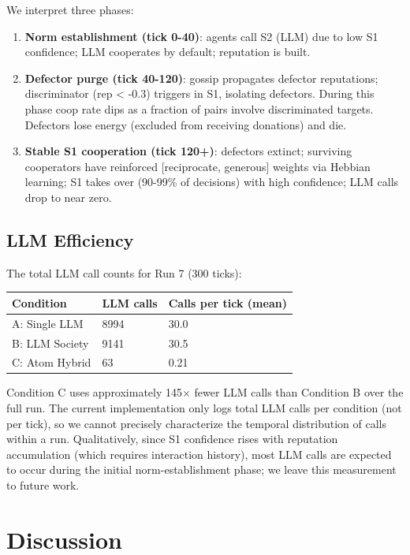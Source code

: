 \documentclass[
  11pt,
  letterpaper,
]{article}
\newcounter{none} %
\providecommand{\tightlist}{%
  \setlength{\itemsep}{0pt}\setlength{\parskip}{0pt}}
\begin{document}
We interpret three phases:

\begin{enumerate}
\def\labelenumi{\arabic{enumi}.}
\tightlist
\item
  \textbf{Norm establishment (tick 0-40)}: agents call S2 (LLM) due to
  low S1 confidence; LLM cooperates by default; reputation is built.
\item
  \textbf{Defector purge (tick 40-120)}: gossip propagates defector
  reputations; discriminator (rep \textless{} -0.3) triggers in S1,
  isolating defectors. During this phase coop rate dips as a fraction of
  pairs involve discriminated targets. Defectors lose energy (excluded
  from receiving donations) and die.
\item
  \textbf{Stable S1 cooperation (tick 120+)}: defectors extinct;
  surviving cooperators have reinforced {[}reciprocate, generous{]}
  weights via Hebbian learning; S1 takes over (90-99\% of decisions)
  with high confidence; LLM calls drop to near zero.
\end{enumerate}

\subsection{LLM Efficiency}\label{llm-efficiency}

The total LLM call counts for Run 7 (300 ticks):

{\def\LTcaptype{none} %
\begin{longtable}[]{@{}lll@{}}
\toprule\noalign{}
Condition & LLM calls & Calls per tick (mean) \\
\midrule\noalign{}
\endhead
\bottomrule\noalign{}
\endlastfoot
A: Single LLM & 8994 & 30.0 \\
B: LLM Society & 9141 & 30.5 \\
C: Atom Hybrid & 63 & 0.21 \\
\end{longtable}
}

Condition C uses approximately 145× fewer LLM calls than Condition B
over the full run. The current implementation only logs total LLM calls
per condition (not per tick), so we cannot precisely characterize the
temporal distribution of calls within a run. Qualitatively, since S1
confidence rises with reputation accumulation (which requires
interaction history), most LLM calls are expected to occur during the
initial norm-establishment phase; we leave this measurement to future
work.

\section{Discussion}\label{discussion}
\end{document}
